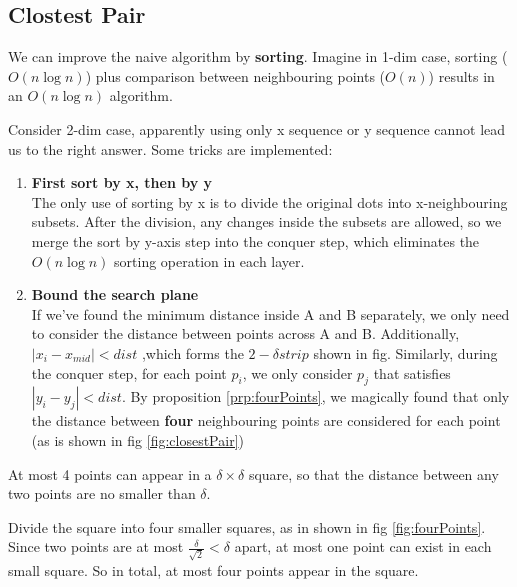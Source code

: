 \subsection{Clostest Pair}
We can improve the naive algorithm by \textbf{sorting}. Imagine in 1-dim case, sorting ($O(n\log n)$) plus comparison between neighbouring points ($O(n)$) results in an $O(n \log n)$ algorithm.

Consider 2-dim case, apparently using only x sequence or y sequence cannot lead us to the right answer. Some tricks are implemented:
\begin{enumerate}
    \item \textbf{First sort by x, then by y}\\
    The only use of sorting by x is to divide the original dots into x-neighbouring subsets. After the division, any changes inside the subsets are allowed, so we merge the sort by y-axis step into the conquer step, which eliminates the $O(n\log n)$ sorting operation in each layer.
    \item \textbf{Bound the search plane}\\
    If we've found the minimum distance inside A and B separately, we only need to consider the distance between points across A and B. Additionally, $|x_i-x_{mid}|<dist$ ,which forms the $2-\delta strip$ shown in fig. 
    Similarly, during the conquer step, for each point $p_i$, we only consider $p_j$ that satisfies $|y_i-y_j|<dist$.
    By proposition \ref*{prp:fourPoints}, we magically found that only the distance between \textbf{four} neighbouring points are considered for each point (as is shown in fig \ref*{fig:closestPair})

\end{enumerate}
\begin{prp}
    At most 4 points can appear in a $\delta \times \delta$ square, so that the distance between any two points are no smaller than $\delta$.
    \label{prp:fourPoints}
\end{prp}
\begin{prf}
    Divide the square into four smaller squares, as in shown in fig \ref*{fig:fourPoints}. Since two points are at most $\frac{\delta}{\sqrt{2}}<\delta$ apart, at most one point can exist in each small square. So in total, at most four points appear in the square.
\end{prf}
